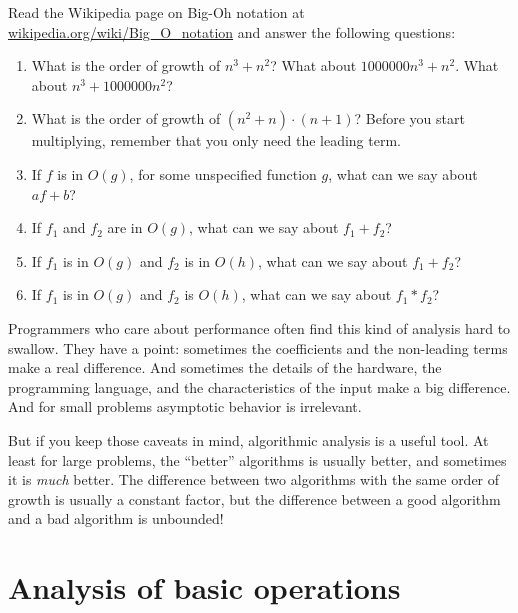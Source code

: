 \documentclass[10pt]{book}
\begin{document}
\begin{ex}

Read the Wikipedia page on Big-Oh notation at
\url{wikipedia.org/wiki/Big_O_notation} and
answer the following questions:

\begin{enumerate}

\item What is the order of growth of $n^3 + n^2$?
What about $1000000 n^3 + n^2$.
What about $n^3 + 1000000 n^2$?  

\item What is the order of growth of $(n^2 + n) \cdot (n + 1)$?  Before
  you start multiplying, remember that you only need the leading term.

\item If $f$ is in $O(g)$, for some unspecified function $g$, what can
  we say about $a f + b$?

\item If $f_1$ and $f_2$ are in $O(g)$, what can we say about $f_1 + f_2$?

\item If  $f_1$ is in $O(g)$
and $f_2$ is in $O(h)$,
what can we say about  $f_1 + f_2$?

\item If  $f_1$ is in $O(g)$ and $f_2$ is $O(h)$,
what can we say about  $f_1 * f_2$?

\end{enumerate}

\end{ex}


Programmers who care about performance often find this kind of
analysis hard to swallow.  They have a point: sometimes the
coefficients and the non-leading terms make a real difference.  And
sometimes the details of the hardware, the programming language, and
the characteristics of the input make a big difference.  And for small
problems asymptotic behavior is irrelevant.

But if you keep those caveats in mind, algorithmic analysis is a
useful tool.  At least for large problems, the ``better'' algorithms
is usually better, and sometimes it is {\em much} better.  The
difference between two algorithms with the same order of growth is
usually a constant factor, but the difference between a good algorithm
and a bad algorithm is unbounded!


\section{Analysis of basic operations}
\end{document}
